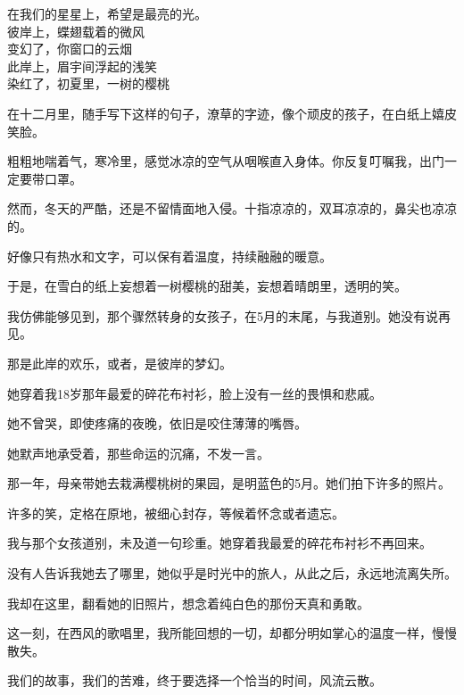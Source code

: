 	\endwriting



		\longpoem{}{}{}
			在我们的星星上，希望是最亮的光。\\
			彼岸上，蝶翅载着的微风 \\
			变幻了，你窗口的云烟 \\
			此岸上，眉宇间浮起的浅笑 \\
			染红了，初夏里，一树的樱桃
		\endlongpoem


		在十二月里，随手写下这样的句子，潦草的字迹，像个顽皮的孩子，在白纸上嬉皮笑脸。

		粗粗地喘着气，寒冷里，感觉冰凉的空气从咽喉直入身体。你反复叮嘱我，出门一定要带口罩。

		然而，冬天的严酷，还是不留情面地入侵。十指凉凉的，双耳凉凉的，鼻尖也凉凉的。

		\vspace{1em}
		好像只有热水和文字，可以保有着温度，持续融融的暖意。


		\vspace{1em}
		于是，在雪白的纸上妄想着一树樱桃的甜美，妄想着晴朗里，透明的笑。

		我仿佛能够见到，那个骤然转身的女孩子，在5月的末尾，与我道别。她没有说再见。

		那是此岸的欢乐，或者，是彼岸的梦幻。


		\vspace{1em}
		她穿着我18岁那年最爱的碎花布衬衫，脸上没有一丝的畏惧和悲戚。

		她不曾哭，即使疼痛的夜晚，依旧是咬住薄薄的嘴唇。

		她默声地承受着，那些命运的沉痛，不发一言。


		\vspace{1em}
		那一年，母亲带她去栽满樱桃树的果园，是明蓝色的5月。她们拍下许多的照片。

		许多的笑，定格在原地，被细心封存，等候着怀念或者遗忘。

		我与那个女孩道别，未及道一句珍重。她穿着我最爱的碎花布衬衫不再回来。

		没有人告诉我她去了哪里，她似乎是时光中的旅人，从此之后，永远地流离失所。

		我却在这里，翻看她的旧照片，想念着纯白色的那份天真和勇敢。


		\vspace{1em}
		这一刻，在西风的歌唱里，我所能回想的一切，却都分明如掌心的温度一样，慢慢散失。

		我们的故事，我们的苦难，终于要选择一个恰当的时间，风流云散。

